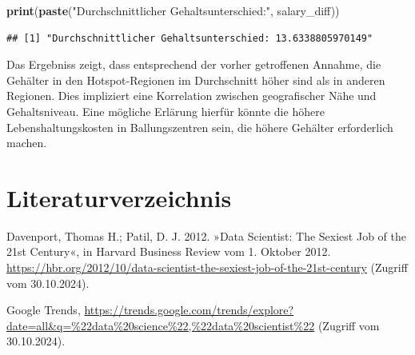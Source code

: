 \documentclass[
]{article}
\newenvironment{Shaded}{\begin{snugshade}}{\end{snugshade}}
\newcommand{\FunctionTok}[1]{\textcolor[rgb]{0.13,0.29,0.53}{\textbf{#1}}}
\newcommand{\NormalTok}[1]{#1}
\newcommand{\StringTok}[1]{\textcolor[rgb]{0.31,0.60,0.02}{#1}}
\begin{document}
\begin{Shaded}
\begin{Highlighting}[]
\FunctionTok{print}\NormalTok{(}\FunctionTok{paste}\NormalTok{(}\StringTok{"Durchschnittlicher Gehaltsunterschied:"}\NormalTok{, salary\_diff))}
\end{Highlighting}
\end{Shaded}

\begin{verbatim}
## [1] "Durchschnittlicher Gehaltsunterschied: 13.6338805970149"
\end{verbatim}

Das Ergebniss zeigt, dass entsprechend der vorher getroffenen Annahme,
die Gehälter in den Hotspot-Regionen im Durchschnitt höher sind als in
anderen Regionen. Dies impliziert eine Korrelation zwischen
geografischer Nähe und Gehaltsniveau. Eine mögliche Erlärung hierfür
könnte die höhere Lebenshaltungskosten in Ballungszentren sein, die
höhere Gehälter erforderlich machen.

\newpage

\section{Literaturverzeichnis}\label{literaturverzeichnis}

Davenport, Thomas H.; Patil, D. J. 2012. »Data Scientist: The Sexiest
Job of the 21st Century«, in Harvard Business Review vom 1. Oktober
2012.
\url{https://hbr.org/2012/10/data-scientist-the-sexiest-job-of-the-21st-century}
(Zugriff vom 30.10.2024).

Google Trends,
\url{https://trends.google.com/trends/explore?date=all&q=\%22data\%20science\%22,\%22data\%20scientist\%22}
(Zugriff vom 30.10.2024).
\end{document}
